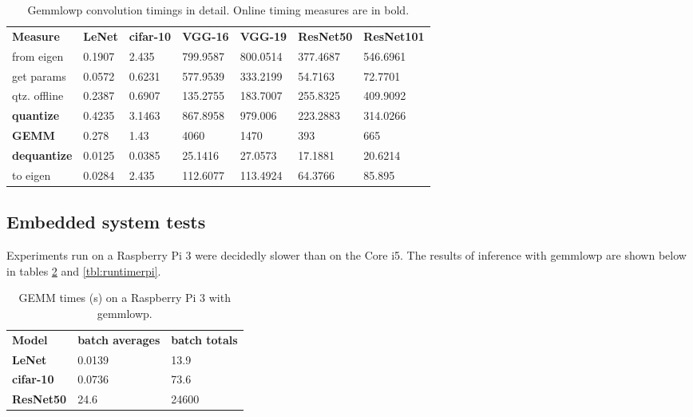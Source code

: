\begin{table}[]
\centering
\caption[Gemmlowp convolution timings in detail]{Gemmlowp convolution timings in detail. Online timing measures are in bold.}
\label{tbl:detailedgemmlowp}
\begin{tabular}{lllllll}
\textbf{Measure}	& \textbf{LeNet} & \textbf{cifar-10} & \textbf{VGG-16} & \textbf{VGG-19} & \textbf{ResNet50} & \textbf{ResNet101} \\
from eigen & 0.1907         & 2.435              & 799.9587            & 800.0514            & 377.4687               & 546.6961                \\       
get params          & 0.0572         & 0.6231            & 577.9539         & 333.2199         & 54.7163           & 72.7701           \\
qtz. offline    & 0.2387         & 0.6907            & 135.2755        & 183.7007         & 255.8325          & 409.9092			\\   
\textbf{quantize}             & 0.4235         & 3.1463           & 867.8958        & 979.006        & 223.2883          & 314.0266            \\
\textbf{GEMM}                 & 0.278          & 1.43              & 4060            & 1470            & 393             & 665              \\       
\textbf{dequantize}           & 0.0125         & 0.0385            & 25.1416        & 27.0573        & 17.1881          & 20.6214            \\
to eigen   & 0.0284         & 2.435             & 112.6077       & 113.4924        & 64.3766          & 85.895    
\end{tabular}
\end{table}

\subsection{Embedded system tests}
Experiments run on a Raspberry Pi 3 were decidedly slower than on the Core i5. The results of inference with gemmlowp are shown below in tables \ref{tbl:gemmtimerpi} and \ref{tbl:runtimerpi}.

\begin{table}[]
\centering
\caption[Raspberry Pi GEMM times (gemmlowp)]{GEMM times (s) on a Raspberry Pi 3 with gemmlowp.}
\label{tbl:gemmtimerpi}
\begin{tabular}{lll}

\textbf{Model}    & \textbf{batch averages}                    & \textbf{batch totals}                    \\  
\textbf{LeNet}                 & 0.0139                           & 13.9           	\\
\textbf{cifar-10}             & 0.0736                           & 73.6           	\\
\textbf{ResNet50}             	& 24.6        		          		& 24600       
\end{tabular}
\end{table}

